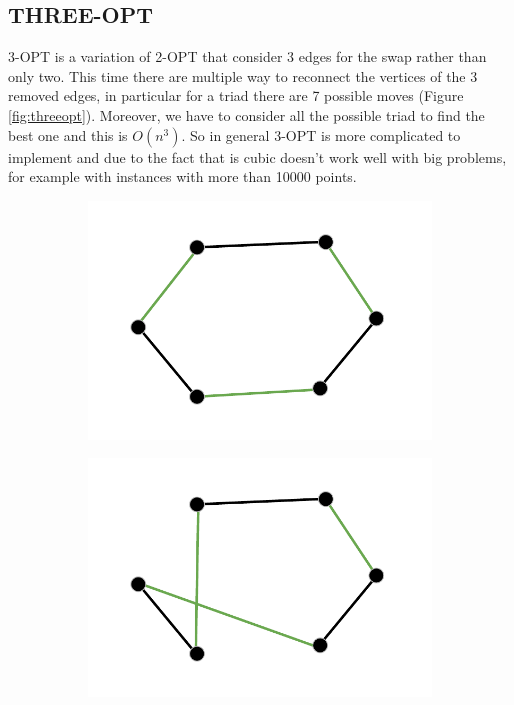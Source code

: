\subsection{THREE-OPT}
3-OPT is a variation of 2-OPT that consider 3 edges for the swap rather than only two. This time there are multiple way to reconnect the vertices of the 3 removed edges, in particular for a triad there are 7 possible moves (Figure  \ref{fig:threeopt}). Moreover, we have to consider all the possible triad to find the best one and this is $O(n^3)$. So in general 3-OPT is more complicated to implement and due to the fact that is cubic doesn't work well with big problems, for example with instances with more than 10000 points.

\begin{figure}[h!]
  \centering
  \begin{subfigure}[b]{0.24\linewidth}
    \includegraphics[width=\linewidth]{media/threeopt1.pdf}
     \caption{}
  \end{subfigure}
  \begin{subfigure}[b]{0.24\linewidth}
    \includegraphics[width=\linewidth]{media/threeopt2.pdf}

\end{subfigure}
\end{figure}
